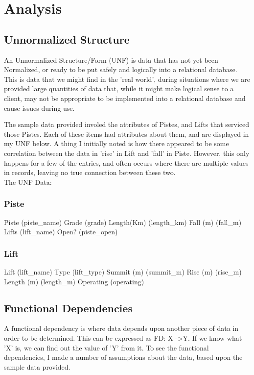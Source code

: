 \documentclass[11pt]{scrartcl} %
\begin{document}
\section{Analysis}
\subsection{Unnormalized Structure}
An Unnormalized Structure/Form (UNF) is data that has not yet been Normalized, or ready to be put safely and logically into a relational database. This is data that we might find in the 'real world', during situations where we are provided large quantities of data that, while it might make logical sense to a client, may not be appropriate to be implemented into a relational database and cause issues during use.

The sample data provided\cite{sample} involed the attributes of Pistes, and Lifts that serviced those Pistes. Each of these items had attributes about them, and are displayed in my UNF below. A thing I initially noted is how there appeared to be some correlation between the data in 'rise' in Lift and 'fall' in Piste. However, this only happens for a few of the entries, and often occurs where there are multiple values in records, leaving no true connection between these two.\\[0.3cm]
The UNF Data:

\subsubsection{Piste}
Piste (piste\_name)\newline
Grade (grade)\newline
Length(Km) (length\_km)\newline
Fall (m) (fall\_m)\newline
Lifts (lift\_name)\newline
Open? (piste\_open)

\subsubsection{Lift}
Lift (lift\_name)\newline
Type (lift\_type)\newline
Summit (m) (summit\_m)\newline
Rise (m) (rise\_m)\newline
Length (m) (length\_m)\newline
Operating (operating)

\subsection{Functional Dependencies}
A functional dependency is where data depends upon another piece of data in order to be determined. This can be expressed as FD: X -\textgreater \space Y. If we know what 'X' is, we can find out the value of 'Y' from it. To see the functional dependencies, I made a number of assumptions about the data, based upon the sample data provided.
\end{document}
